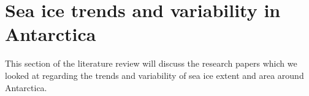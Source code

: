\section{Sea ice trends and variability in Antarctica}
This section of the literature review will discuss the research papers which we looked at regarding the trends and variability of sea ice extent and area around Antarctica.